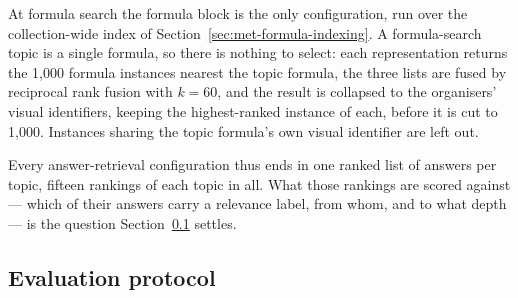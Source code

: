 At formula search the formula block is the only configuration, run over the collection-wide
index of Section~\ref{sec:met-formula-indexing}. A formula-search topic is a single formula, so
there is nothing to select: each representation returns the 1{,}000 formula instances nearest
the topic formula, the three lists are fused by reciprocal rank fusion with $k = 60$, and the
result is collapsed to the organisers' visual identifiers, keeping the highest-ranked instance
of each, before it is cut to 1{,}000. Instances sharing the topic formula's own visual
identifier are left out.

Every answer-retrieval configuration thus ends in one ranked list of answers per topic, fifteen
rankings of each topic in all. What those rankings are scored against --- which of their
answers carry a relevance label, from whom, and to what depth --- is the question
Section~\ref{sec:met-evaluation-protocol} settles.

\subsection{Evaluation protocol}\label{sec:met-evaluation-protocol}

